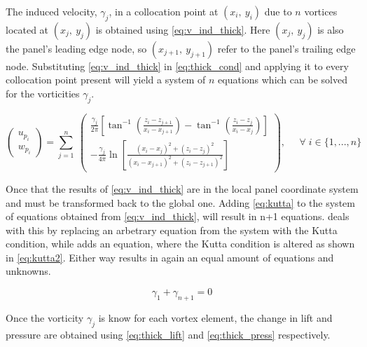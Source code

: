 The induced velocity, $\gamma_j$, in a collocation point at $(x_i,\: y_i)$ due
to $n$ vortices located at $(x_j, \: y_j)$ is obtained using
\autoref{eq:v_ind_thick}. Here $(x_j, \: y_j)$ is also the panel's leading edge
node, so $(x_{j+1}, \: y_{j+1})$ refer to the panel's trailing edge node.
Substituting \autoref{eq:v_ind_thick} in \autoref{eq:thick_cond} and applying it
to every collocation point present will yield a system of $n$ equations which
can be solved for the vorticities $\gamma_j$.

\begin{equation}
\label{eq:v_ind_thick}
    \left(\begin{array}{l}
    u_{p_i} \\ w_{p_i}
    \end{array}\right)
    =
    \sum_{j=1}^{n} \:
    \left(\begin{array}{c}
    \frac{\gamma_j}{2\pi}\left[ \tan^{-1} \left(
        \frac{z_i - z_{j+1}}{x_i - x_{j+1}}\right)
         - \tan^{-1} \left( \frac{z_i - z_j}{x_i - x_j}\right) \right] \\[1em]
    -\frac{\gamma_j}{4\pi} \ln \left[ \frac{\left( x_i - x_j \right)^2 +
    \left( z_i - z_j \right)^2}{\left( x_i - x_{j+1}\right)^2 +
    \left( z_i - z_{j+1} \right)^2 }  \right]
    \end{array}\right), \; \; \; \; \; \forall \; i \in \{1,...,n\}
\end{equation}
\medskip

Once that the results of \autoref{eq:v_ind_thick} are in the local panel
coordinate system and must be transformed back to the global one. Adding
\autoref{eq:kutta} to the system of equations obtained from
\autoref{eq:v_ind_thick}, will result in n+1 equations.
\citeauthor{katz_plotkin}\cite{katz_plotkin} deals with this by replacing an
arbetrary equation from the system with the Kutta condition, while
\citeauthor{kuethe_chow_1998}\cite{kuethe_chow_1998} adds an equation, where the
Kutta condition is altered as shown in \autoref{eq:kutta2}. Either way results
in again an equal amount of equations and unknowns.

\begin{equation}
  \label{eq:kutta2}
      \gamma_1 + \gamma_{n+1} = 0
  \end{equation}

Once the vorticity $\gamma_j$ is know for each vortex element, the change in
lift and pressure are obtained using \autoref{eq:thick_lift} and
\autoref{eq:thick_press} respectively.

